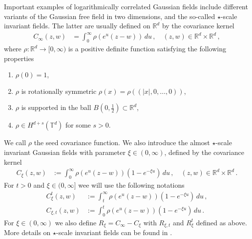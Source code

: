 \documentclass[11pt]{article}
\numberwithin{equation}{section}
\newcounter{exa}
\theoremstyle{definition}
\renewcommand{\leq}{\;\leqslant\;}                   %
\newcommand{\R}{\mathbb{R}}
\def\T{\mathbb{T}}
\begin{document}
Important examples of logarithmically correlated Gaussian fields include different variants of the Gaussian free field in two dimensions, and the so-called $\star$-scale invariant fields. The latter are usually defined on $\R^d$ by the covariance kernel
\begin{align}
C_\infty(z,w) &= \int_0^\infty \rho(e^u ( z-w ) )  \, du\,, \quad (z,w) \in \R^d \times \R^d\,,
\end{align}
where $\rho: \R^d \to [0, \infty)$ is a positive definite function satisfying the following properties
\begin{enumerate}
\item $\rho(0) = 1$,
\item $\rho$ is rotationally symmetric $\rho(x) = \rho( (|x|,0,\hdots,0) )$,
\item $\rho$ is supported in the ball $B(0,\frac{1}{2}) \subset \R^d$, 
\item $\rho \in H^{d+s}(\T^d)$ for some $s > 0$.
\end{enumerate}
We call $\rho$ the seed covariance function. We also introduce the almost $\star$-scale invariant Gaussian fields with parameter $\xi \in (0,\infty)$, defined by the covariance kernel
\begin{align}\label{C_xi}
C_\xi(z,w) &:= \int_0^\infty \rho(e^u ( z-w ) ) (1 - e^{-\xi u} ) \, du\,, \quad (z,w) \in \R^d \times \R^d \,.
\end{align}
For $t > 0$ and $\xi \in (0,\infty]$ wee will use the following notations
\begin{align}\label{eq:C_xi_t}
C_\xi^t(z,w) &:= \int_t^\infty \rho(e^u(z-w))(1-e^{-\xi u}) \, du \,, \\
C_{\xi,t}(z,w) &:= \int_0^t \rho(e^u(z-w))(1-e^{-\xi u}) \, du \,.
\end{align}
For $\xi \in (0,\infty)$ we also define $R_\xi = C_\infty - C_\xi$ with $R_{\xi,t}$ and $R_\xi^t$ defined as above. More details on $\star$-scale invariant fields can be found in \cite{JSW,AJJ}.
\end{document}
